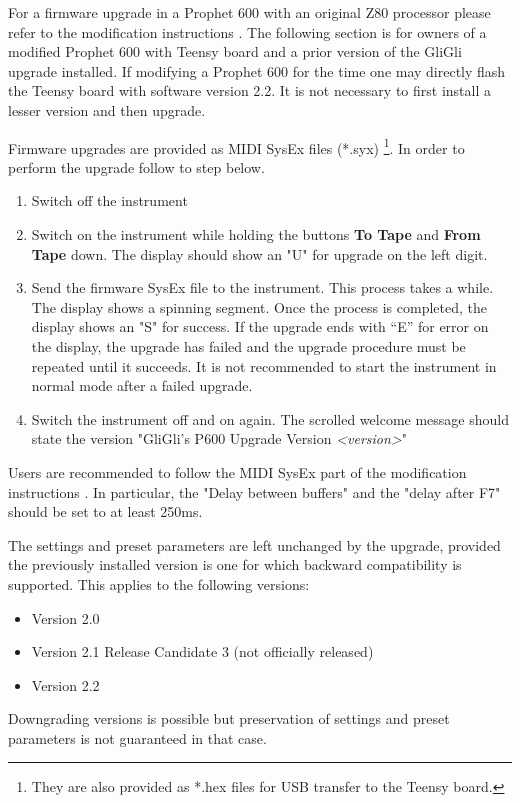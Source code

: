 \documentclass[draft,landscape, 11pt, oneside]{report}
\newenvironment{flowtext}{\addmargin[0cm]{7cm}}{\endaddmargin} %
\begin{document}
\begin{flowtext}
For a firmware upgrade in a Prophet 600 with an original Z80 processor please refer to the modification instructions \cite{modinstructions}. The following section is for owners of a modified Prophet 600 with Teensy board and a prior version of the GliGli upgrade installed. If modifying a Prophet 600 for the time one may directly flash the Teensy board with software version 2.2. It is not necessary to first install a lesser version and then upgrade.

Firmware upgrades are provided as MIDI SysEx files (*.syx) \footnote{They are also provided as *.hex files for USB transfer to the Teensy board.}. In order to perform the upgrade follow to step below.

\begin{enumerate}
  \setlength\itemsep{0cm}
  \item Switch off the instrument
  \item Switch on the instrument while holding the buttons \textbf{To Tape} and \textbf{From Tape} down. The display should show an "U" for upgrade on the left digit.
  \item Send the firmware SysEx file to the instrument. This process takes a while. The display shows a spinning segment. Once the process is completed, the display shows an "S" for success. If the upgrade ends with “E” for error on the display, the upgrade has failed and the upgrade procedure must be repeated until it succeeds. It is not recommended to start the instrument in normal mode after a failed upgrade.
  \item Switch the instrument off and on again. The scrolled welcome message should state the version "GliGli's P600 Upgrade Version \textit{<version>}"
\end{enumerate}

Users are recommended to follow the MIDI SysEx part of the modification instructions \cite{modinstructions}. In particular, the "Delay between buffers" and the "delay after F7" should be set to at least 250ms.

The settings and preset parameters are left unchanged by the upgrade, provided the previously installed version is one for which backward compatibility is supported. This applies to the following versions:

\begin{itemize}
  \setlength\itemsep{0cm}
  \item Version 2.0
  \item Version 2.1 Release Candidate 3 (not officially released)
  \item Version 2.2  
\end{itemize} 

Downgrading versions is possible but preservation of settings and preset parameters is not guaranteed in that case.

\end{flowtext}
\end{document}
